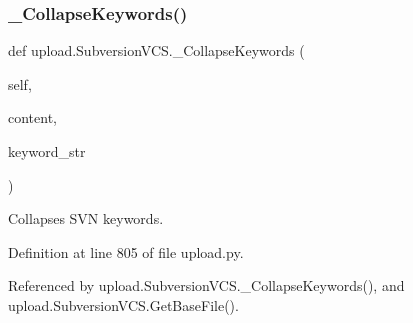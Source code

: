 \subsubsection{\texorpdfstring{\+\_\+\+Collapse\+Keywords()}{\_CollapseKeywords()}\hspace{0.1cm}{\footnotesize\ttfamily [1/2]}}
{\footnotesize\ttfamily def upload.\+Subversion\+V\+C\+S.\+\_\+\+Collapse\+Keywords (\begin{DoxyParamCaption}\item[{}]{self,  }\item[{}]{content,  }\item[{}]{keyword\+\_\+str }\end{DoxyParamCaption})\hspace{0.3cm}{\ttfamily [private]}}

\begin{DoxyVerb}Collapses SVN keywords.\end{DoxyVerb}
 

Definition at line 805 of file upload.\+py.



Referenced by upload.\+Subversion\+V\+C\+S.\+\_\+\+Collapse\+Keywords(), and upload.\+Subversion\+V\+C\+S.\+Get\+Base\+File().


